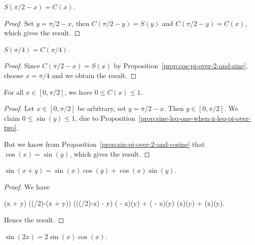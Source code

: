 \begin{proposition}\label{prop:sin-pi-over-2-and-cosine}
$S(\pi/2 - x) = C(x)$.
\end{proposition}
\begin{proof}
Set $y = \pi/2 - x$, then $C(\pi/2 - y) = S(y)$ and $C(\pi/2 - y) = C(x)$,
which gives the result.
\end{proof}

\begin{proposition}\label{prop:sine-pi-over-four-equals-cosine-pi-over-four}
$S(\pi/4) = C(\pi/4)$.
\end{proposition}
\begin{proof}
  Since $C(\pi/2 - x) = S(x)$ by Proposition~\ref{prop:cos-pi-over-2-and-sine}, choose $x=\pi/4$ and we obtain the result.
\end{proof}

\begin{proposition}\label{prop:cosine-is-positive-on-0-to-pi-over-2}
For all $x\in[0,\pi/2]$, we have $0\leq C(x)\leq 1$.
\end{proposition}
\begin{proof}
  Let $x\in[0,\pi/2]$ be arbitrary, set $y=\pi/2-x$. Then $y\in[0,\pi/2]$.
  We claim $0\leq\sin(y)\leq 1$, due to Proposition~\ref{prop:sine-leq-one-when-x-leq-pi-over-two}.

  But we know from Proposition~\ref{prop:sin-pi-over-2-and-cosine} that
  $\cos(x)=\sin(y)$, which gives the result.
\end{proof}

\begin{proposition}\label{prop:sine-of-sum}
$\sin(x + y) = \sin(x)\cos(y) + \cos(x)\sin(y)$.
\end{proposition}
\begin{proof}
We have
\begin{calculation}
\sin(x + y)
\cos((\pi/2)-(x + y))
\cos\left(\bigl((\pi/2)-x\bigr) - y\right)
\cos\left( - x\right)\cos(y) + \sin\left( - x\right)\sin(y)
\sin(x)\cos(y) + \cos(x)\sin(y).
\end{calculation}
Hence the result.
\end{proof}

\begin{proposition}\label{prop:double-angle-for-sine}
$\sin(2x) = 2\sin(x)\cos(x)$.
\end{proposition}

